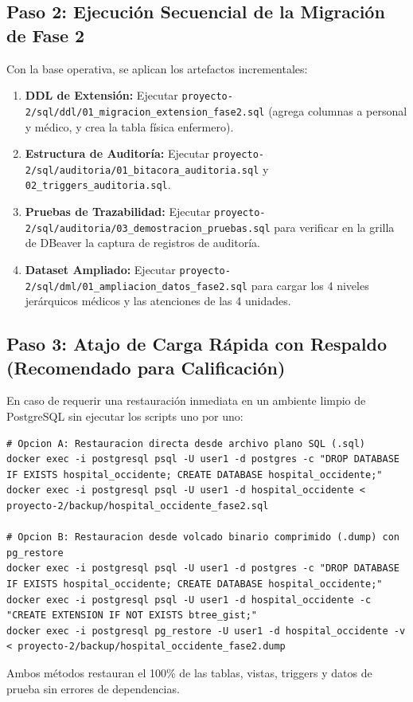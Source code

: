 \documentclass[11pt,a4paper]{article}
\begin{document}
\subsection{Paso 2: Ejecución Secuencial de la Migración de Fase 2}
Con la base operativa, se aplican los artefactos incrementales:
\begin{enumerate}
	\item \textbf{DDL de Extensión:} Ejecutar \texttt{proyecto-2/sql/ddl/01\_migracion\_extension\_fase2.sql} (agrega columnas a personal y médico, y crea la tabla física enfermero).
	\item \textbf{Estructura de Auditoría:} Ejecutar \texttt{proyecto-2/sql/auditoria/01\_bitacora\_auditoria.sql} y \texttt{02\_triggers\_auditoria.sql}.
	\item \textbf{Pruebas de Trazabilidad:} Ejecutar \texttt{proyecto-2/sql/auditoria/03\_demostracion\_pruebas.sql} para verificar en la grilla de DBeaver la captura de registros de auditoría.
	\item \textbf{Dataset Ampliado:} Ejecutar \texttt{proyecto-2/sql/dml/01\_ampliacion\_datos\_fase2.sql} para cargar los 4 niveles jerárquicos médicos y las atenciones de las 4 unidades.
\end{enumerate}

\subsection{Paso 3: Atajo de Carga Rápida con Respaldo (Recomendado para Calificación)}
En caso de requerir una restauración inmediata en un ambiente limpio de PostgreSQL sin ejecutar los scripts uno por uno:
\begin{lstlisting}[style=sqlstyle]
# Opcion A: Restauracion directa desde archivo plano SQL (.sql)
docker exec -i postgresql psql -U user1 -d postgres -c "DROP DATABASE IF EXISTS hospital_occidente; CREATE DATABASE hospital_occidente;"
docker exec -i postgresql psql -U user1 -d hospital_occidente < proyecto-2/backup/hospital_occidente_fase2.sql

# Opcion B: Restauracion desde volcado binario comprimido (.dump) con pg_restore
docker exec -i postgresql psql -U user1 -d postgres -c "DROP DATABASE IF EXISTS hospital_occidente; CREATE DATABASE hospital_occidente;"
docker exec -i postgresql psql -U user1 -d hospital_occidente -c "CREATE EXTENSION IF NOT EXISTS btree_gist;"
docker exec -i postgresql pg_restore -U user1 -d hospital_occidente -v < proyecto-2/backup/hospital_occidente_fase2.dump
\end{lstlisting}
Ambos métodos restauran el 100\% de las tablas, vistas, triggers y datos de prueba sin errores de dependencias.
\end{document}
